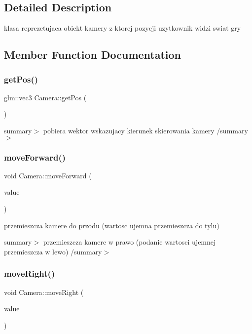 \subsection{Detailed Description}
klasa reprezetujaca obiekt kamery z ktorej pozycji uzytkownik widzi swiat gry 



\subsection{Member Function Documentation}
\mbox{\label{class_camera_ab40fb75b3d34a86d92fff61bb1675097}} 
\subsubsection{\texorpdfstring{get\+Pos()}{getPos()}}
{\footnotesize\ttfamily glm\+::vec3 Camera\+::get\+Pos (\begin{DoxyParamCaption}{ }\end{DoxyParamCaption})}

summary$>$ pobiera wektor wskazujacy kierunek skierowania kamery /summary$>$ \mbox{\label{class_camera_a79693c3d7c085b0252216f8348b525ce}} 
\subsubsection{\texorpdfstring{move\+Forward()}{moveForward()}}
{\footnotesize\ttfamily void Camera\+::move\+Forward (\begin{DoxyParamCaption}\item[{G\+Lfloat}]{value }\end{DoxyParamCaption})}



przemieszcza kamere do przodu (wartosc ujemna przemieszcza do tylu) 

summary$>$ przemieszcza kamere w prawo (podanie wartosci ujemnej przemieszcza w lewo) /summary$>$ \mbox{\label{class_camera_ac0f82a424f190cc4f65e5f485d2317d2}} 
\subsubsection{\texorpdfstring{move\+Right()}{moveRight()}}
{\footnotesize\ttfamily void Camera\+::move\+Right (\begin{DoxyParamCaption}\item[{G\+Lfloat}]{value }\end{DoxyParamCaption})}

